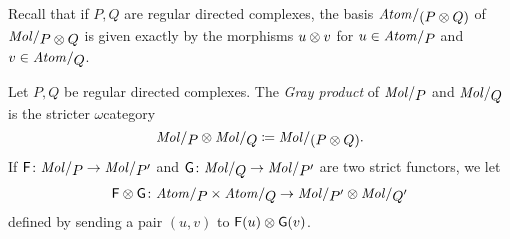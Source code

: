 Recall that if \( P, Q \) are regular directed complexes, the basis \( \atomin{(P \gray Q)} \) of \( \molecin{P \gray Q} \) is given exactly by the morphisms \( u \otimes v \) for \( u \in \atomin{P} \) and \( v \in \atomin{Q} \).  

\begin{dfn}  \label{dfn:gray_product_of_stricter_regular_complexes}
    Let \( P, Q \) be regular directed complexes.
    The \emph{Gray product} of \( \molecin{P} \) and \( \molecin{Q} \) is the stricter \( \omega \)\nbd category
    \begin{equation*}
        \molecin{P} \gray \molecin{Q} \eqdef \molecin{(P \gray Q)}.
    \end{equation*}
    If \( \F \colon \molecin{P} \to \molecin{P'} \) and \( \G \colon \molecin{Q} \to \molecin{P'} \) are two strict functors, we let 
    \begin{equation*}
        \F \gray \G \colon \atomin{P} \times \atomin{Q} \to  \molecin{P'} \gray \molecin{Q'}
    \end{equation*}
    defined by sending a pair \( (u, v) \) to \( \mathsf{F}(u) \otimes \mathsf{G}(v) \).
\end{dfn}

